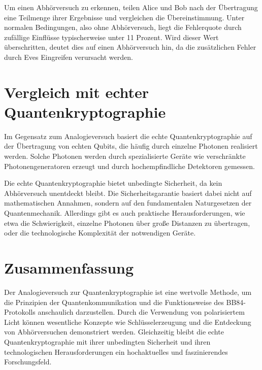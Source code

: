 Um einen Abhörversuch zu erkennen, teilen Alice und Bob nach der Übertragung eine Teilmenge ihrer Ergebnisse und vergleichen die Übereinstimmung. Unter normalen Bedingungen, also ohne Abhörversuch, liegt die Fehlerquote durch zufällige Einflüsse typischerweise unter 11 Prozent. Wird dieser Wert überschritten, deutet dies auf einen Abhörversuch hin, da die zusätzlichen Fehler durch Eves Eingreifen verursacht werden.

\section{Vergleich mit echter Quantenkryptographie}
Im Gegensatz zum Analogieversuch basiert die echte Quantenkryptographie auf der Übertragung von echten Qubits, die häufig durch einzelne Photonen realisiert werden. Solche Photonen werden durch spezialisierte Geräte wie verschränkte Photonengeneratoren erzeugt und durch hochempfindliche Detektoren gemessen. 

Die echte Quantenkryptographie bietet unbedingte Sicherheit, da kein Abhörversuch unentdeckt bleibt. Die Sicherheitsgarantie basiert dabei nicht auf mathematischen Annahmen, sondern auf den fundamentalen Naturgesetzen der Quantenmechanik. Allerdings gibt es auch praktische Herausforderungen, wie etwa die Schwierigkeit, einzelne Photonen über große Distanzen zu übertragen, oder die technologische Komplexität der notwendigen Geräte.

\section{Zusammenfassung}
Der Analogieversuch zur Quantenkryptographie ist eine wertvolle Methode, um die Prinzipien der Quantenkommunikation und die Funktionsweise des BB84-Protokolls anschaulich darzustellen. Durch die Verwendung von polarisiertem Licht können wesentliche Konzepte wie Schlüsselerzeugung und die Entdeckung von Abhörversuchen demonstriert werden. Gleichzeitig bleibt die echte Quantenkryptographie mit ihrer unbedingten Sicherheit und ihren technologischen Herausforderungen ein hochaktuelles und faszinierendes Forschungsfeld.
